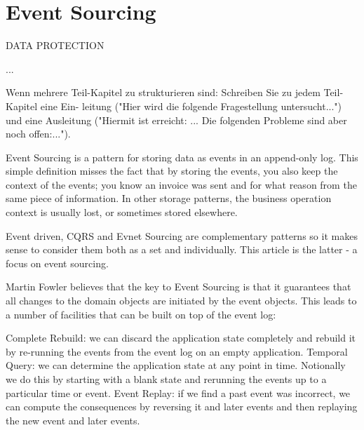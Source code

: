 %
\chapter{Event Sourcing}\label{chap:es}

DATA PROTECTION

...\citep{fowler2022es}

Wenn mehrere Teil-Kapitel zu strukturieren sind: Schreiben Sie zu jedem Teil-Kapitel eine Ein- leitung ("Hier wird die folgende Fragestellung untersucht...") und eine Ausleitung ("Hiermit ist erreicht: ... Die folgenden Probleme sind aber noch offen:...").

Event Sourcing is a pattern for storing data as events in an append-only log. This simple definition misses the fact that by storing the events, you also keep the context of the events; you know an invoice was sent and for what reason from the same piece of information. In other storage patterns, the business operation context is usually lost, or sometimes stored elsewhere. %

Event driven, CQRS and Evnet Sourcing are complementary patterns so it makes sense to consider them both as a set and individually. This article is the latter - a focus on event sourcing.



Martin Fowler believes that the key to Event Sourcing is that it guarantees that all changes to the domain objects are initiated by the event objects. This leads to a number of facilities that can be built on top of the event log:

Complete Rebuild: we can discard the application state completely and rebuild it by re-running the events from the event log on an empty application.
Temporal Query: we can determine the application state at any point in time. Notionally we do this by starting with a blank state and rerunning the events up to a particular time or event.
Event Replay: if we find a past event was incorrect, we can compute the consequences by reversing it and later events and then replaying the new event and later events. %

